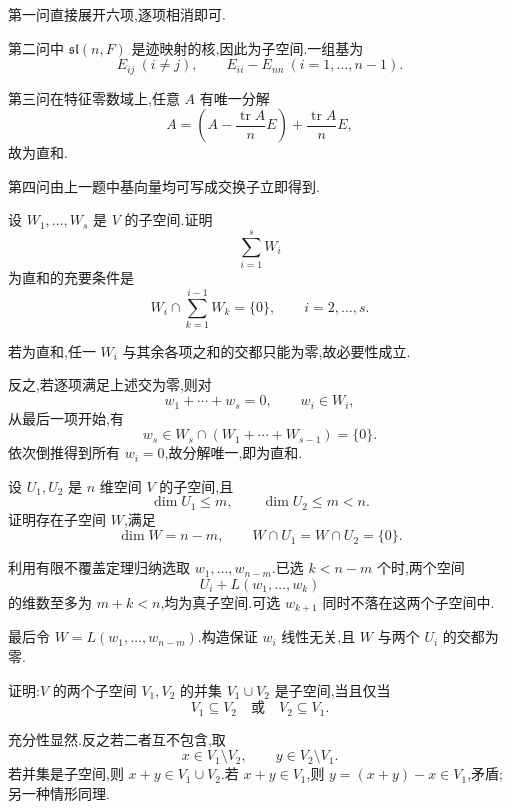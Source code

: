 \begin{solution}
第一问直接展开六项,逐项相消即可.

第二问中 $\mathfrak{sl}(n,F)$ 是迹映射的核,因此为子空间.一组基为
\[
E_{ij}\ (i\neq j),
\qquad
E_{ii}-E_{nn}\ (i=1,\ldots,n-1).
\]

第三问在特征零数域上,任意 $A$ 有唯一分解
\[
A=
\left(A-\dfrac{\operatorname{tr}A}{n}E\right)
+\dfrac{\operatorname{tr}A}{n}E,
\]
故为直和.

第四问由上一题中基向量均可写成交换子立即得到.
\end{solution}

\begin{example}
设 $W_1,\ldots,W_s$ 是 $V$ 的子空间.证明
\[
\displaystyle\sum\limits_{i=1}^sW_i
\]
为直和的充要条件是
\[
W_i\cap\sum\limits_{k=1}^{i-1}W_k=\{0\},
\qquad i=2,\ldots,s.
\]
\end{example}
\exampleblank

\begin{solution}
若为直和,任一 $W_i$ 与其余各项之和的交都只能为零,故必要性成立.

反之,若逐项满足上述交为零,则对
\[
w_1+\cdots+w_s=0,
\qquad w_i\in W_i,
\]
从最后一项开始,有
\[
w_s\in W_s\cap(W_1+\cdots+W_{s-1})=\{0\}.
\]
依次倒推得到所有 $w_i=0$,故分解唯一,即为直和.
\end{solution}

\begin{example}
设 $U_1,U_2$ 是 $n$ 维空间 $V$ 的子空间,且
\[
\dim U_1\leq m,\qquad \dim U_2\leq m<n.
\]
证明存在子空间 $W$,满足
\[
\dim W=n-m,
\qquad W\cap U_1=W\cap U_2=\{0\}.
\]
\end{example}
\exampleblank

\begin{solution}
利用有限不覆盖定理归纳选取 $w_1,\ldots,w_{n-m}$.已选 $k<n-m$ 个时,两个空间
\[
U_i+L(w_1,\ldots,w_k)
\]
的维数至多为 $m+k<n$,均为真子空间.可选 $w_{k+1}$ 同时不落在这两个子空间中.

最后令 $W=L(w_1,\ldots,w_{n-m})$.构造保证 $w_i$ 线性无关,且 $W$ 与两个 $U_i$ 的交都为零.
\end{solution}

\begin{example}
证明:$V$ 的两个子空间 $V_1,V_2$ 的并集 $V_1\cup V_2$ 是子空间,当且仅当
\[
V_1\subseteq V_2
\quad\text{或}\quad
V_2\subseteq V_1.
\]
\end{example}
\exampleblank

\begin{solution}
充分性显然.反之若二者互不包含,取
\[
x\in V_1\setminus V_2,
\qquad
y\in V_2\setminus V_1.
\]
若并集是子空间,则 $x+y\in V_1\cup V_2$.若 $x+y\in V_1$,则 $y=(x+y)-x\in V_1$,矛盾;另一种情形同理.
\end{solution}

